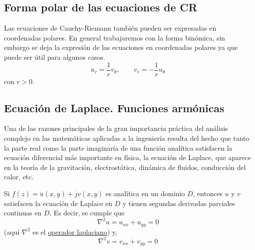 \subsection{Forma polar de las ecuaciones de CR}

Las ecuaciones de Cauchy-Riemann también pueden ser expresadas en coordenadas polares. En general trabajaremos con la forma binómica, sin embargo se deja la expresión de las ecuaciones en coordenadas polares ya que puede ser útil para algunos casos.
\begin{equation}
  u_r = \frac{1}{r}v_\theta, \qquad v_r =  -\frac{1}{r}u_\theta
\end{equation} 
con $r>0$.

\subsection{Ecuación de Laplace. Funciones armónicas}\label{sec:laplace_eq}

Una de las razones principales de la gran importancia práctica del análisis complejo en las matemáticas aplicadas a la ingeniería resulta del hecho que tanto la parte real como la parte imaginaria de una función analítica satisfacen la ecuación diferencial más importante en física, la ecuación de Laplace, que aparece en la teoría de la gravitación, electrostática, dinámica de fluidos, conducción del calor, etc.

\begin{theorem}
  Si $f(z)=u(x,y)+jv(x,y)$ es analítica en un dominio $D$, entonces $u$ y $v$ satisfacen la ecuación de Laplace en $D$ y tienen segundas derivadas parciales continuas en $D$. Es decir, se cumple que
  \begin{equation}\label{eq:laplace_u}
    \nabla^2 u = u_{xx} + u_{yy} = 0
  \end{equation}
  (aquí $\nabla^2$ es el \href{https://en.wikipedia.org/wiki/Laplace_operator}{operador laplaciano}) y,
  \begin{equation}\label{eq:laplace_v}
    \nabla^2 v = v_{xx} + v_{yy} = 0
  \end{equation}
\end{theorem}

